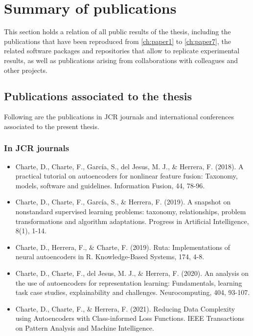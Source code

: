 \section{Summary of publications}

This section holds a relation of all public results of the thesis, including the publications that have been reproduced from \autoref{ch:paper1} to \autoref{ch:paper7}, the related software packages and repositories that allow to replicate experimental results, as well as publications arising from collaborations with colleagues and other projects.

\subsection{Publications associated to the thesis}

Following are the publications in JCR journals and international conferences associated to the present thesis.

\subsubsection{In JCR journals}

\begin{itemize}
    \item Charte, D., Charte, F., García, S., del Jesus, M. J., \& Herrera, F. (2018). A practical tutorial on autoencoders for nonlinear feature fusion: Taxonomy, models, software and guidelines. Information Fusion, 44, 78-96.
    \item Charte, D., Charte, F., García, S., \& Herrera, F. (2019). A snapshot on nonstandard supervised learning problems: taxonomy, relationships, problem transformations and algorithm adaptations. Progress in Artificial Intelligence, 8(1), 1-14.
    \item Charte, D., Herrera, F., \& Charte, F. (2019). Ruta: Implementations of neural autoencoders in R. Knowledge-Based Systems, 174, 4-8.
    \item Charte, D., Charte, F., del Jesus, M. J., \& Herrera, F. (2020). An analysis on the use of autoencoders for representation learning: Fundamentals, learning task case studies, explainability and challenges. Neurocomputing, 404, 93-107.
    \item Charte, D., Charte, F., \& Herrera, F. (2021). Reducing Data Complexity using Autoencoders with Class-informed Loss Functions. IEEE Transactions on Pattern Analysis and Machine Intelligence.
\end{itemize}

